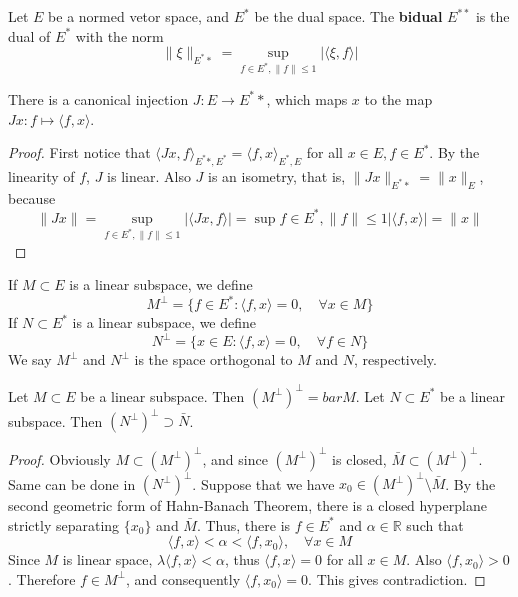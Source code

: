 \begin{defn} Let $E$ be a normed vetor space, and $E^*$ be the dual space. The \textbf{bidual} $E^{**}$ is the dual of $E^*$ with the norm
\begin{equation}
\|\xi\|_{E^**}=\sup_{f\in E^*,\|f\|\leq 1}|\langle \xi,f\rangle|
\end{equation}
\end{defn}

\begin{prop} There is a canonical injection $J:E\rightarrow E^**$, which maps $x$ to the map $Jx:f\mapsto \langle f,x\rangle$.
\end{prop}
\begin{proof}
First notice that $\langle Jx,f\rangle_{E^**,E^*}=\langle f,x\rangle_{E^*,E}$ for all $x\in E, f\in E^*$. By the linearity of $f$, $J$ is linear. Also $J$ is an isometry, that is, $\|Jx\|_{E^**}=\|x\|_E$, because
\begin{equation}
\|Jx\|=\sup_{f\in E^*,\|f\|\leq 1}|\langle Jx,f\rangle|=\sup{f\in E^*,\|f\|\leq 1}|\langle f,x\rangle|=\|x\|
\end{equation}
\end{proof}

\begin{defn} If $M\subset E$ is a linear subspace, we define
\begin{equation}
M^\perp =\{f\in E^*:\langle f,x\rangle=0,\quad \forall x\in M\}
\end{equation}
If $N\subset E^*$ is a linear subspace, we define
\begin{equation}
N^\perp = \{x\in E:\langle f,x\rangle=0,\quad \forall f\in N\}
\end{equation}
We say $M^\perp$ and $N^\perp$ is the space orthogonal to $M$ and $N$, respectively.
\end{defn}

\begin{prop} Let $M\subset E$ be a linear subspace. Then $(M^\perp)^\perp=bar{M}$. Let $N\subset E^*$ be a linear subspace. Then $(N^\perp)^\perp \supset \bar{N}$.
\end{prop}
\begin{proof}
Obviously $M\subset (M^\perp)^\perp$, and since $(M^\perp)^\perp$ is closed, $\bar{M}\subset (M^\perp)^\perp$. Same can be done in $(N^\perp)^\perp$. Suppose that we have $x_0\in (M^\perp)^\perp\setminus \bar{M}$. By the second geometric form of Hahn-Banach Theorem, there is a closed hyperplane strictly separating $\{x_0\}$ and $\bar{M}$. Thus, there is $f\in E^*$ and $\alpha\in \mathbb{R}$ such that
\begin{equation}
\langle f,x\rangle <\alpha<\langle f,x_0\rangle,\quad \forall x\in M
\end{equation}
Since $M$ is linear space, $\lambda \langle f,x\rangle<\alpha$, thus $\langle f,x\rangle=0$ for all $x\in M$. Also $\langle f,x_0\rangle>0$. Therefore $f\in M^\perp$, and consequently $\langle f,x_0\rangle=0$. This gives contradiction.
\end{proof}

